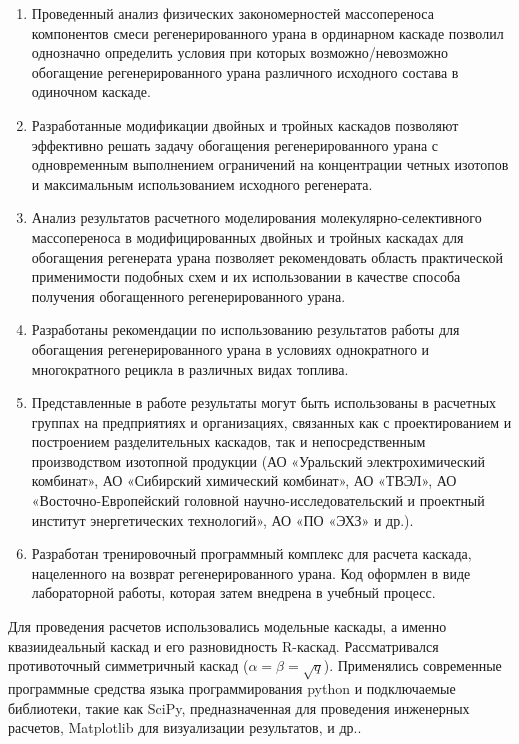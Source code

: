 {\influence} 
\begin{enumerate}
  \item Проведенный анализ физических закономерностей массопереноса компонентов смеси регенерированного урана в ординарном каскаде позволил однозначно определить условия при которых возможно/невозможно обогащение регенерированного урана различного исходного состава в одиночном каскаде.
  \item Разработанные модификации двойных и тройных каскадов позволяют эффективно решать задачу обогащения регенерированного урана с одновременным выполнением ограничений на концентрации четных изотопов и максимальным использованием исходного регенерата.
  \item Анализ результатов расчетного моделирования молекулярно-селективного массопереноса в модифицированных двойных и тройных каскадах для обогащения регенерата урана позволяет рекомендовать область практической применимости подобных схем и их использовании в качестве способа получения обогащенного регенерированного урана.
  \item Разработаны рекомендации по использованию результатов работы для обогащения регенерированного урана в условиях однократного и многократного рецикла в различных видах топлива.
  \item  Представленные в работе результаты могут быть использованы в расчетных группах на предприятиях и организациях, связанных как с проектированием и построением разделительных каскадов, так и непосредственным производством изотопной продукции (АО «Уральский электрохимический комбинат», АО «Сибирский химический комбинат», АО «ТВЭЛ», АО «Восточно-Европейский головной научно-исследовательский и проектный институт энергетических технологий», АО «ПО «ЭХЗ» и др.).
  \item Разработан тренировочный программный комплекс для расчета каскада, нацеленного на возврат регенерированного урана. Код оформлен в виде лабораторной работы, которая затем внедрена в учебный процесс.
\end{enumerate}

{\methods} Для проведения расчетов использовались модельные каскады, а именно квазиидеальный каскад и его разновидность R-каскад. Рассматривался противоточный симметричный каскад ($\alpha=\beta=\sqrt{q}$). Применялись современные программные средства языка программирования python и подключаемые библиотеки, такие как SciPy, предназначенная для проведения инженерных расчетов, Matplotlib для визуализации результатов, и др..

